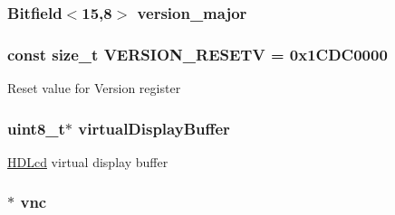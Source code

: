 \label{classHDLcd_acb906433e1289aa1c251dc5057746a88}
\hypertarget{classHDLcd_a74571fc488367403e0193898d0a5367e}{
\subsubsection[{version\_\-major}]{\setlength{\rightskip}{0pt plus 5cm}Bitfield$<$15,8$>$ {\bf version\_\-major}}}
\label{classHDLcd_a74571fc488367403e0193898d0a5367e}
\hypertarget{classHDLcd_a4f40fa952becdbdacf7434cd3c404b7d}{
\subsubsection[{version\_\-minor}]{}}
\label{classHDLcd_a4f40fa952becdbdacf7434cd3c404b7d}
\hypertarget{classHDLcd_a0cd2a036c21a49eadcc056ff0f20f8dd}{
\subsubsection[{VERSION\_\-RESETV}]{\setlength{\rightskip}{0pt plus 5cm}const size\_\-t {\bf VERSION\_\-RESETV} = 0x1CDC0000}}
\label{classHDLcd_a0cd2a036c21a49eadcc056ff0f20f8dd}
Reset value for Version register \hypertarget{classHDLcd_af1670e6105cdc695dd52fdde8c18f3e1}{
\subsubsection[{virtualDisplayBuffer}]{\setlength{\rightskip}{0pt plus 5cm}uint8\_\-t$\ast$ {\bf virtualDisplayBuffer}}}
\label{classHDLcd_af1670e6105cdc695dd52fdde8c18f3e1}
\hyperlink{classHDLcd}{HDLcd} virtual display buffer \hypertarget{classHDLcd_a52d1b5d3426a30e18a452cd67d87ec13}{
\subsubsection[{vnc}]{$\ast$ {\bf vnc}}}
